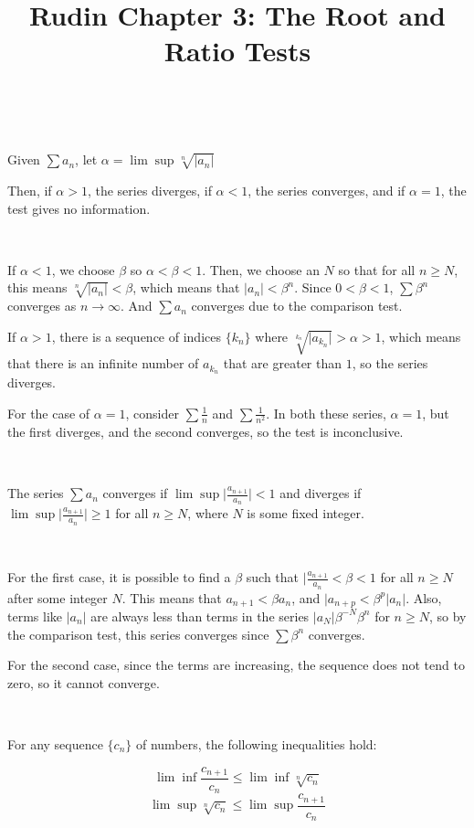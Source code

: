 \documentclass{article}
\title{Rudin Chapter 3: The Root and Ratio Tests}
\begin{document}
\maketitle

\begin{theorem}
\

Given $\sum a_n$, let $\alpha = \lim \sup \sqrt[n]{\vert a_n \vert}$

Then, if $\alpha > 1$, the series diverges, if $\alpha < 1$, the series converges, and if $\alpha = 1$, the test gives no information.
\end{theorem}

\begin{customproof}
\

If $\alpha < 1$, we choose $\beta$ so $\alpha < \beta < 1$. Then, we choose an $N$ so that for all $n \geq N$, this means $\sqrt[n]{\vert a_n \vert} < \beta$, which means that $\vert a_n \vert < \beta^n$. Since $0 < \beta < 1$, $\sum \beta^n$ converges as $n \to \infty$. And $\sum a_n$ converges due to the comparison test.

If $\alpha > 1$, there is a sequence of indices $\{k_n\}$ where $\sqrt[k_n]{\vert a_{k_n}\vert} > \alpha > 1$, which means that there is an infinite number of $a_{k_n}$ that are greater than $1$, so the series diverges.

For the case of $\alpha = 1$, consider $\sum \frac{1}{n}$ and $\sum \frac{1}{n^2}$. In both these series, $\alpha =1$, but the first diverges, and the second converges, so the test is inconclusive.
\end{customproof}

\begin{theorem}
\

The series $\sum a_n$ converges if $\lim \sup \vert \frac{a_{n+1}}{a_n} \vert < 1$ and diverges if $\lim \sup \vert \frac{a_{n+1}}{a_n} \vert \geq 1 $ for all $n \geq N$, where $N$ is some fixed integer.
\end{theorem}

\begin{customproof}
\

For the first case, it is possible to find a $\beta$ such that $\vert \frac{a_{n+1}}{a_n} < \beta < 1$ for all $n \geq N$ after some integer $N$. This means that $a_{n+1} < \beta a_n$, and $\vert a_{n+p} < \beta^p \vert a_n \vert$. Also, terms like $\vert a_n \vert$ are always less than terms in the series $\vert a_N \vert \beta^{-N} \beta^n$ for $n \geq N$, so by the comparison test, this series converges since $\sum \beta^n$ converges.

For the second case, since the terms are increasing, the sequence does not tend to zero, so it cannot converge.
\end{customproof}

\begin{theorem}
\

For any sequence $\{c_n\}$ of numbers, the following inequalities hold:

$$\lim \inf \frac{c_{n+1}}{c_n} \leq \lim \inf \sqrt[n]{c_n}$$$$\lim \sup \sqrt[n]{c_n} \leq \lim \sup \frac{c_{n+1}}{c_n}$$
\end{theorem}
\end{document}
